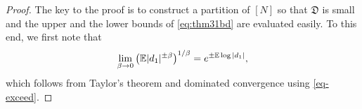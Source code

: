\documentclass{amsart}
\numberwithin{equation}{section}
\def\corAB{}
\def\corOZ{}
\begin{document}
\begin{proof}
%
%
  \corAB{The key to the proof is to construct a partition of $[N]$ so that $\mathfrak{D}$ is small and the upper and the lower bounds of \eqref{eq:thm31bd} are evaluated easily.} \corOZ{To this end, we first note that}
 \begin{equation}\label{eq:claim-log}
 \lim_{\beta \to 0} \left(\mathbb E |d_1|^{\pm \beta} \right)^{1/\beta} = e^{\pm \mathbb E \log |d_1|},
 \end{equation}
 \corOZ{which follows from Taylor's theorem and dominated convergence using
 \eqref{eq-exceed}.}
%


\end{proof}
\end{document}

